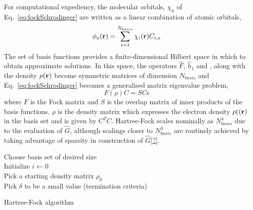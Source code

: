 \documentclass[twoside,11pt]{article}
\begin{document}
For computational expediency, the molecular orbitals, $\chi_a$ of Eq.~\ref{eq:fockSchrodinger} are written as a linear combination of atomic orbitals,
\begin{equation}\label{eq:lcao}
\phi_a({\bf r}) = \sum_{i=1}^{N_{basis}} \chi_i({\bf r}) C_{i,a}
\end{equation}
The set of basis functions provides a finite-dimensional Hilbert space in which to obtain approximate solutions. In this space, the operators $\hat{F}$, $\hat{h}_1$ and , along with the density $\rho({\bf r})$ become symmetric matrices of dimension $N_{basis}$ and Eq.~\ref{eq:fockSchrodinger} becomes a generalised matrix eigenvalue problem,
\begin{equation}\label{eq:fockMatrix}
F(\rho)C = SC\epsilon
\end{equation}
where $F$ is the Fock matrix and $S$ is the overlap matrix of inner products of the basis functions. $\rho$ is the density matrix which expresses the electron density $\rho(({\bf r})$ in the basis set and is given by $C^TC$. Hartree-Fock scales nominally as $N_{basis}^4$ due to the evaluation of $\hat{G}$, although scalings closer to $N_{basis}^3$ are routinely achieved by taking advantage of sparsity in construction of $\hat{G}$\ref{?}.


\begin{algorithm}[htb]
	Choose basis set of desired size \\
	Initialize $i \leftarrow	 0$ \\	
	Pick a starting density matrix $\rho_0$ \\
	Pick $\delta$ to be a small value (termination criteria) \\
 \caption{Hartree-Fock algorithm}
\label{alg:hf}
\end{algorithm}
\end{document}
